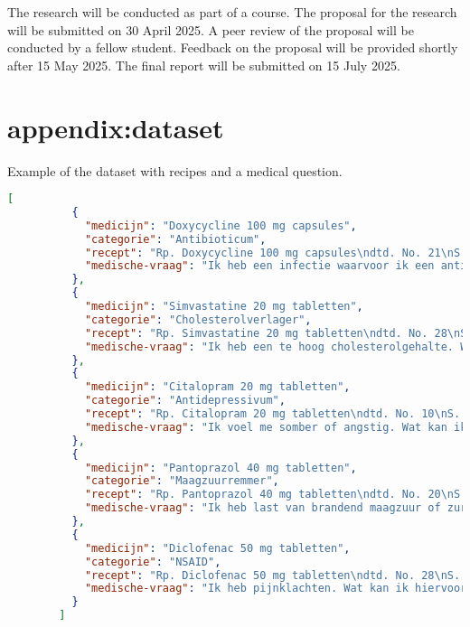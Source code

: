 \documentclass[a4paper,doc,natbib]{apa6}
\begin{document}
    The research will be conducted as part of a course. The proposal for the research will be submitted on 30 April 2025. A peer review of the proposal will be conducted by a fellow student. Feedback on the proposal will be provided shortly after 15 May 2025. The final report will be submitted on 15 July 2025.

    

    \appendix

    \section{appendix:dataset}

    Example of the dataset with recipes and a medical question.

    \begin{lstlisting}[language=json]
        [
          {
            "medicijn": "Doxycycline 100 mg capsules",
            "categorie": "Antibioticum",
            "recept": "Rp. Doxycycline 100 mg capsules\ndtd. No. 21\nS. 1 tablet 3x per dag, gedurende 5 dagen.",
            "medische-vraag": "Ik heb een infectie waarvoor ik een antibioticum nodig heb. Welk middel kan ik gebruiken?"
          },
          {
            "medicijn": "Simvastatine 20 mg tabletten",
            "categorie": "Cholesterolverlager",
            "recept": "Rp. Simvastatine 20 mg tabletten\ndtd. No. 28\nS. 1 capsule 2x daags, gedurende 7 dagen.",
            "medische-vraag": "Ik heb een te hoog cholesterolgehalte. Wat kan ik hiervoor innemen?"
          },
          {
            "medicijn": "Citalopram 20 mg tabletten",
            "categorie": "Antidepressivum",
            "recept": "Rp. Citalopram 20 mg tabletten\ndtd. No. 10\nS. 1 tablet zo nodig bij klachten, maximaal 3 per dag.",
            "medische-vraag": "Ik voel me somber of angstig. Wat kan ik hiervoor gebruiken?"
          },
          {
            "medicijn": "Pantoprazol 40 mg tabletten",
            "categorie": "Maagzuurremmer",
            "recept": "Rp. Pantoprazol 40 mg tabletten\ndtd. No. 20\nS. 1 tablet 3x per dag, gedurende 5 dagen.",
            "medische-vraag": "Ik heb last van brandend maagzuur of zure reflux. Wat kan ik hiervoor nemen?"
          },
          {
            "medicijn": "Diclofenac 50 mg tabletten",
            "categorie": "NSAID",
            "recept": "Rp. Diclofenac 50 mg tabletten\ndtd. No. 28\nS. 1 capsule elke 12 uur, met voedsel innemen.",
            "medische-vraag": "Ik heb pijnklachten. Wat kan ik hiervoor slikken?"
          }
        ]
    \end{lstlisting}
\end{document}
